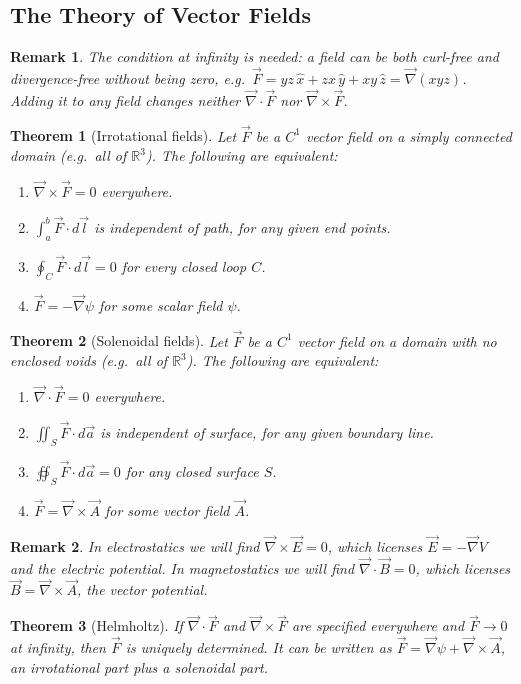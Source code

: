\documentclass{article}
\newtheorem{theorem}{Theorem}
\newtheorem{remark}{Remark}
\begin{document}
\subsection{The Theory of Vector Fields}
\begin{remark}
    The condition at infinity is needed: a field can be both curl-free and divergence-free without being zero, e.g.\ $\vec{F} = yz\,\hat{x} + zx\,\hat{y} + xy\,\hat{z} = \vec{\nabla}(xyz)$. Adding it to any field changes neither $\vec{\nabla}\cdot\vec{F}$ nor $\vec{\nabla}\times\vec{F}$.
\end{remark}
\begin{theorem}[Irrotational fields]
    \label{irrotational}
    Let $\vec{F}$ be a $C^1$ vector field on a simply connected domain (e.g.\ all of $\mathbb{R}^3$). The following are equivalent:
    \begin{enumerate}[label=(\roman*)]
        \item $\vec{\nabla}\times\vec{F} = 0$ everywhere.
        \item $\int_a^b \vec{F}\cdot d\vec{l}$ is independent of path, for any given end points.
        \item $\oint_C \vec{F}\cdot d\vec{l} = 0$ for every closed loop $C$.
        \item $\vec{F} = -\vec{\nabla}\psi$ for some scalar field $\psi$.
    \end{enumerate}
\end{theorem}
\begin{theorem}[Solenoidal fields]
    Let $\vec{F}$ be a $C^1$ vector field on a domain with no enclosed voids (e.g.\ all of $\mathbb{R}^3$). The following are equivalent:
    \begin{enumerate}[label=(\roman*)]
        \item $\vec{\nabla}\cdot\vec{F} = 0$ everywhere.
        \item $\iint_S \vec{F}\cdot d\vec{a}$  is independent of surface, for any given boundary line.
        \item $\oiint_S \vec{F}\cdot d\vec{a} = 0$ for any closed surface $S$.
        \item $\vec{F} = \vec{\nabla}\times\vec{A}$ for some vector field $\vec{A}$.
    \end{enumerate}
\end{theorem}
\begin{remark}
    In electrostatics we will find $\vec{\nabla}\times\vec{E} = 0$, which licenses $\vec{E} = -\vec{\nabla}V$ and the electric potential. In magnetostatics we will find $\vec{\nabla}\cdot\vec{B} = 0$, which licenses $\vec{B} = \vec{\nabla}\times\vec{A}$, the vector potential.
\end{remark}
\begin{theorem}[Helmholtz]
    If $\vec{\nabla}\cdot\vec{F}$ and $\vec{\nabla}\times\vec{F}$ are specified everywhere and $\vec{F}\to 0$ at infinity, then $\vec{F}$ is uniquely determined. It can be written as $\vec{F} = \vec{\nabla}\psi + \vec{\nabla}\times\vec{A}$, an irrotational part plus a solenoidal part.
\end{theorem}
\end{document}
